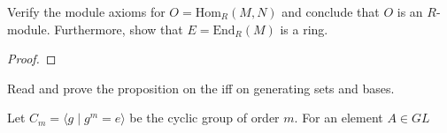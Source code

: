 \documentclass[num=3,duedate=02-24-21,course=Algebra\ II,proflastname=Walton]{hwtemplate}
\begin{document}

% 

\maketitle
\pagebreak
\problem[1]
\begin{claim}
	Verify the module axioms for \(O = \textrm{Hom}_R(M,N)\) and conclude that \(O\) is an \(R\)-module. Furthermore, show that \(E = \textrm{End}_R(M)\) is a ring.
\end{claim}

\begin{proof}

\end{proof}

\problem[2]
\begin{claim}
	Read and prove the proposition on the iff on generating sets and bases.
\end{claim}

\problem[3]
\begin{claim}
	Let \(C_m = \langle g \mid g^{m}=e \rangle \) be the cyclic group of order \(m\). For an element \(A \in GL\)
\end{claim}

\separator
\end{document}
